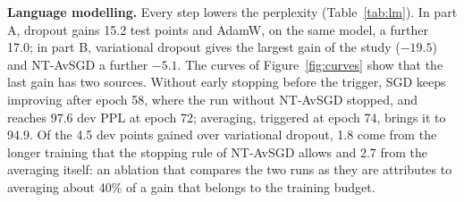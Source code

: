 \documentclass[10pt,twocolumn,a4paper]{article}
\newcommand{\para}[1]{\textbf{#1}\hspace{0.4em}}
\begin{document}
\para{Language modelling.} Every step lowers the perplexity (Table~\ref{tab:lm}). In part A, dropout gains 15.2
test points and AdamW, on the same model, a further 17.0; in part B, variational dropout gives the largest gain of
the study ($-19.5$) and NT-AvSGD a further $-5.1$. The curves of Figure~\ref{fig:curves} show that the last gain
has two sources. Without early stopping before the trigger, SGD keeps improving after epoch 58, where the run
without NT-AvSGD stopped, and reaches 97.6 dev PPL at epoch 72; averaging, triggered at epoch 74, brings it to
94.9. Of the 4.5 dev points gained over variational dropout, 1.8 come from the longer training that the stopping
rule of NT-AvSGD allows and 2.7 from the averaging itself: an ablation that compares the two runs as they are
attributes to averaging about 40\% of a gain that belongs to the training budget.
\end{document}
